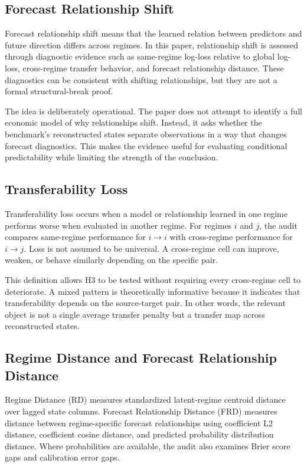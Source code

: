 \documentclass[12pt,a4paper]{article}
\begin{document}
\subsection{Forecast Relationship Shift}

Forecast relationship shift means that the learned relation between predictors and future direction differs across regimes. In this paper, relationship shift is assessed through diagnostic evidence such as same-regime log-loss relative to global log-loss, cross-regime transfer behavior, and forecast relationship distance. These diagnostics can be consistent with shifting relationships, but they are not a formal structural-break proof.

The idea is deliberately operational. The paper does not attempt to identify a full economic model of why relationships shift. Instead, it asks whether the benchmark's reconstructed states separate observations in a way that changes forecast diagnostics. This makes the evidence useful for evaluating conditional predictability while limiting the strength of the conclusion.

\subsection{Transferability Loss}

Transferability loss occurs when a model or relationship learned in one regime performs worse when evaluated in another regime. For regimes \(i\) and \(j\), the audit compares same-regime performance for \(i \rightarrow i\) with cross-regime performance for \(i \rightarrow j\). Loss is not assumed to be universal. A cross-regime cell can improve, weaken, or behave similarly depending on the specific pair.

This definition allows H3 to be tested without requiring every cross-regime cell to deteriorate. A mixed pattern is theoretically informative because it indicates that transferability depends on the source-target pair. In other words, the relevant object is not a single average transfer penalty but a transfer map across reconstructed states.

\subsection{Regime Distance and Forecast Relationship Distance}

Regime Distance (RD) measures standardized latent-regime centroid distance over lagged state columns. Forecast Relationship Distance (FRD) measures distance between regime-specific forecast relationships using coefficient L2 distance, coefficient cosine distance, and predicted probability distribution distance. Where probabilities are available, the audit also examines Brier score gaps and calibration error gaps.
\end{document}
